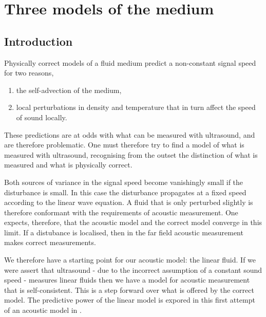 

\chapter{Three models of the medium}\label{ch:medium}



\section{Introduction}
Physically correct models of a fluid medium predict a non-constant signal speed for two reasons,
\begin{enumerate}
\item the self-advection of the medium,
\item local perturbations in density and temperature that in turn affect the speed of sound locally.
\end{enumerate}
These predictions are at odds with what can be measured with ultrasound, and are therefore problematic.
One must therefore try to find a model of what is measured with ultrasound,
recognising from the outset the distinction of what is measured and what is physically correct.

Both sources of variance in the signal speed become vanishingly small if the disturbance is small.
In this case the disturbance propagates at a fixed speed according to the linear wave equation.
A fluid that is only perturbed slightly is therefore conformant with the requirements of acoustic measurement.
One expects, therefore,
that the acoustic model and the correct model converge in this limit.
If a distubance is localised, then in the far field acoustic measurement makes correct measurements.

We therefore have a starting point for our acoustic model: the linear fluid.
If we were assert that ultrasound - due to the incorrect assumption of a constant sound speed - measures linear fluids
then we have a model for acoustic measurement that is self-consistent.
This is a step forward over what is offered by the correct model.
The predictive power of the linear model is expored in this first attempt of an acoustic model in .

